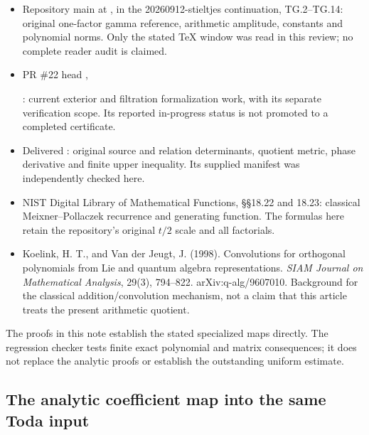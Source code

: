 \begin{itemize}
\tightlist
\item
  Repository main at ,
   in the 20260912-stieltjes
  continuation, TG.2--TG.14: original one-factor gamma reference,
  arithmetic amplitude, constants and polynomial norms. Only the stated
  TeX window was read in this review; no complete reader audit is
  claimed.
\item
  PR \#22 head ,\par
  :
  current exterior and filtration formalization work, with its separate
  verification scope. Its reported in-progress status is not promoted to
  a completed certificate.
\item
  Delivered : original
  source and relation determinants, quotient metric, phase derivative
  and finite upper inequality. Its supplied manifest was independently
  checked here.
\item
  NIST Digital Library of Mathematical Functions, \S\S18.22 and 18.23:
  classical Meixner--Pollaczek recurrence and generating function. The
  formulas here retain the repository's original \(t/2\) scale and all
  factorials.
\item
  Koelink, H. T., and Van der Jeugt, J. (1998). Convolutions for
  orthogonal polynomials from Lie and quantum algebra representations.
  \emph{SIAM Journal on Mathematical Analysis}, 29(3), 794--822.
  arXiv:q-alg/9607010. Background for the classical addition/convolution
  mechanism, not a claim that this article treats the present arithmetic
  quotient.
\end{itemize}

The proofs in this note establish the stated specialized maps directly.
The regression checker tests finite exact polynomial and matrix
consequences; it does not replace the analytic proofs or establish the
outstanding uniform estimate.


\endgroup

\subsection[\hspace{0.4em}The analytic coefficient map into the same Toda input]{The analytic coefficient map into the same Toda input}
\label{sec:gamma-toda-analytic-coefficient-map}

